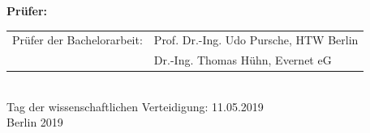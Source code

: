 \begin{titlepage}
\begin{center}
    \vspace{1cm}

    \large \textbf{Prüfer:}

    \vspace{.2cm}

		\begin{tabular}{rl}
		Prüfer der Bachelorarbeit:	& Prof. Dr.-Ing. Udo Pursche, HTW Berlin\\
						& Dr.-Ing. Thomas Hühn, Evernet eG\\
		\end{tabular}\\

    \vspace{2cm}
    \large Tag der wissenschaftlichen Verteidigung: 11.05.2019\\
    \vspace{0.5cm}
    \large Berlin 2019\\

  \end{center}
\end{titlepage}
